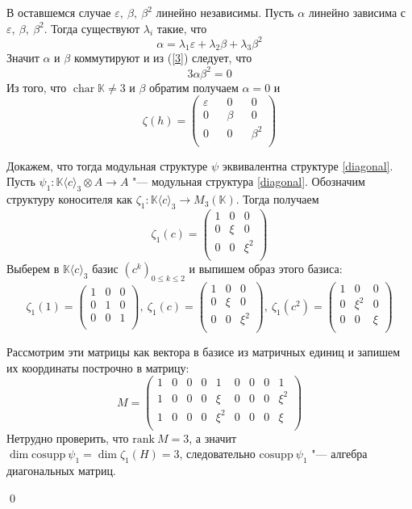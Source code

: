 \documentclass[12pt, reqno, a4paper, oneside, notitlepage]{amsart}
\makeatletter
\theoremstyle{mytheoremstyle}
\theoremstyle{myremarkstyle}
\numberwithin{equation}{section}
\renewenvironment{proof}[1][\proofname]{\par\indent {\bfseries #1\@addpunct{.} }}{\qed}
\DeclareMathOperator{\chr}{char}
\makeatother
\begin{document}
\begin{proof}
	В оставшемся случае $\varepsilon,\ \beta,\ \beta^2$ линейно независимы.
	Пусть $\alpha$ линейно зависима с $\varepsilon,\ \beta,\ \beta^2$. Тогда существуют $\lambda_i$ такие, что 
	\[
	  \alpha = \lambda_1\varepsilon + \lambda_2\beta + \lambda_3\beta^2
	\]
	Значит $\alpha$  и $\beta$ коммутируют и из (\ref{3}) следует, что 
	\[
	  3\alpha\beta^2 = 0
	\]
	Из того, что $\chr \mathbb{K} \neq 3$ и $\beta$ обратим получаем $\alpha = 0$ и 
	\[
	  \zeta(h) = \begin{pmatrix} 
		\varepsilon && 0 && 0\\
		0 && \beta && 0\\
		0 && 0 && \beta^2\\
	  \end{pmatrix}
	\]

	Докажем, что тогда модульная структуре $\psi$ эквивалентна структуре \ref{diagonal}.
    Пусть $\psi_1: \mathbb{K}\langle c\rangle_3 \otimes A \to A$ "--- модульная структура \ref{diagonal}.
	Обозначим структуру коносителя как $\zeta_1:\mathbb{K}\langle c\rangle_3 \to M_3(\mathbb{K})$. Тогда получаем \[
    \zeta_1(c) = \begin{pmatrix}
        1 & 0 & 0\\
        0 & \xi & 0\\
        0 & 0 & \xi^2\\
    \end{pmatrix}
    \]
    Выберем в $\mathbb{K}\langle c\rangle_3$  базис $(c^k)_{0 \leq k \leq 2}$ и выпишем образ этого базиса:
    \[
    \zeta_1(1) = \begin{pmatrix}
        1 & 0 & 0\\
        0 & 1 & 0\\
        0 & 0 & 1\\
    \end{pmatrix},\
    \zeta_1(c) = \begin{pmatrix}
        1 & 0 & 0\\
        0 & \xi & 0\\
        0 & 0 & \xi^2\\
    \end{pmatrix},\ 
    \zeta_1(c^2) = \begin{pmatrix}
        1 & 0 & 0\\
        0 & \xi^2 & 0\\
        0 & 0 & \xi\\
    \end{pmatrix}
    \]

    Рассмотрим эти матрицы как вектора в базисе из матричных единиц и запишем их координаты построчно в матрицу: \[
        M = \begin{pmatrix}
            1 & 0 & 0 & 0 & 1 & 0 & 0 & 0 & 1\\
            1 & 0 & 0 & 0 & \xi & 0 & 0 & 0 & \xi^2\\
            1 & 0 & 0 & 0 & \xi^2 & 0 & 0 & 0 & \xi\\
        \end{pmatrix}
    \]
    Нетрудно проверить, что $\mathrm{rank}\ M = 3$, а значит $\dim \mathrm{cosupp}\ \psi_1 = \dim \zeta_1(H) = 3$, следовательно $\mathrm{cosupp}\ \psi_1$ "--- алгебра диагональных матриц.


\end{proof}
\end{document}
